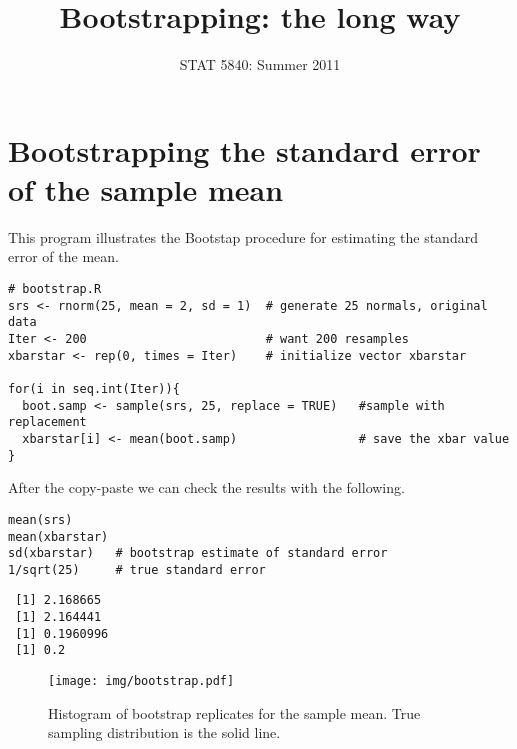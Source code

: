 \documentclass[11pt,english]{article}
\title{Bootstrapping: the long way}
\date{STAT 5840: Summer 2011}
\begin{document}
\maketitle

\thispagestyle{empty}

\section*{Bootstrapping the standard error of the sample mean}
\label{sec-1}

This program illustrates the Bootstap procedure for estimating the standard error of the mean.




\begin{verbatim}
# bootstrap.R
srs <- rnorm(25, mean = 2, sd = 1)  # generate 25 normals, original data 
Iter <- 200                         # want 200 resamples
xbarstar <- rep(0, times = Iter)    # initialize vector xbarstar

for(i in seq.int(Iter)){
  boot.samp <- sample(srs, 25, replace = TRUE)   #sample with replacement
  xbarstar[i] <- mean(boot.samp)                 # save the xbar value
}
\end{verbatim}




After the copy-paste we can check the results with the following.

\begin{verbatim}
mean(srs)
mean(xbarstar)
sd(xbarstar)   # bootstrap estimate of standard error
1/sqrt(25)     # true standard error
\end{verbatim}




\begin{verbatim}
 [1] 2.168665
 [1] 2.164441
 [1] 0.1960996
 [1] 0.2
\end{verbatim}




\begin{figure}[h!]
\centering
\texttt{[image: img/bootstrap.pdf]}
\caption{\label{fig:yplot}Histogram of bootstrap replicates for the sample mean.  True sampling distribution is the solid line.}
\end{figure}
\end{document}
